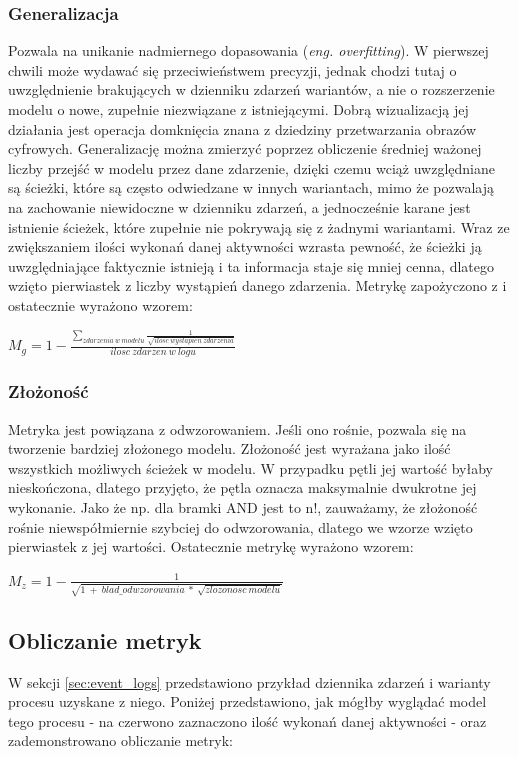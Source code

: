 \subsubsection{Generalizacja}
Pozwala na unikanie nadmiernego dopasowania (\textit{eng. overfitting}). W pierwszej chwili może wydawać się przeciwieństwem precyzji, jednak chodzi tutaj o uwzględnienie brakujących w dzienniku zdarzeń wariantów, a nie o rozszerzenie modelu o nowe, zupełnie niezwiązane z istniejącymi. Dobrą wizualizacją jej działania jest operacja domknięcia znana z dziedziny przetwarzania obrazów cyfrowych. Generalizację można zmierzyć poprzez obliczenie średniej ważonej liczby przejść w modelu przez dane zdarzenie, dzięki czemu wciąż uwzględniane są ścieżki, które są często odwiedzane w innych wariantach, mimo że pozwalają na zachowanie niewidoczne w dzienniku zdarzeń, a jednocześnie karane jest istnienie ścieżek, które zupełnie nie pokrywają się z żadnymi wariantami. Wraz ze zwiększaniem ilości wykonań danej aktywności wzrasta pewność, że ścieżki ją uwzględniające faktycznie istnieją i ta informacja staje się mniej cenna, dlatego wzięto pierwiastek z liczby wystąpień danego zdarzenia. Metrykę zapożyczono z \cite{qd-in-discovery} i ostatecznie wyrażono wzorem:
\begin{center}
$M_g = 1 - \frac{\sum_{zdarzenia\ w\ modelu} \frac{1}{\sqrt{ilosc\ wystapien\ zdarzenia}}}{ilosc\ zdarzen\ w\ logu} $
\end{center}
\subsubsection{Złożoność}
Metryka jest powiązana z odwzorowaniem. Jeśli ono rośnie, pozwala się na tworzenie bardziej złożonego modelu. Złożoność jest wyrażana jako ilość wszystkich możliwych ścieżek w modelu. W przypadku pętli jej wartość byłaby nieskończona, dlatego przyjęto, że pętla oznacza maksymalnie dwukrotne jej wykonanie. Jako że np. dla bramki AND jest to n!, zauważamy, że złożoność rośnie niewspółmiernie szybciej do odwzorowania, dlatego we wzorze wzięto pierwiastek z jej wartości. Ostatecznie metrykę wyrażono wzorem: 
\begin{center}
$M_z = 1 - \frac{1}{\sqrt{1\ +\ blad\_odwzorowania\ *\ \sqrt{zlozonosc\ modelu}}} $
\end{center}
\subsection{Obliczanie metryk}
W sekcji \ref{sec:event_logs} przedstawiono przykład dziennika zdarzeń i warianty procesu uzyskane z niego. Poniżej przedstawiono, jak mógłby wyglądać model tego procesu - na czerwono zaznaczono ilość wykonań danej aktywności - oraz zademonstrowano obliczanie metryk:

